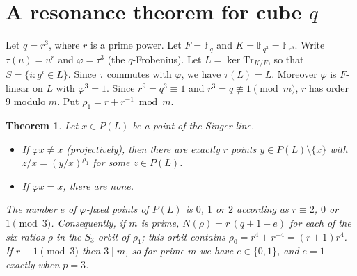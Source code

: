 \documentclass[11pt]{article}
\newtheorem{theorem}{Theorem}
\begin{document}
\section{A resonance theorem for cube $q$}\label{sec:res}
Let $q=r^3$, where $r$ is a prime power. Let $F=\mathbb F_q$ and $K=\mathbb F_{q^3}=\mathbb F_{r^9}$. Write $\tau(u)=u^r$ and $\varphi=\tau^3$ (the $q$-Frobenius).
Let $L=\ker\mathrm{Tr}_{K/F}$, so that $S=\{i: g^i\in L\}$. Since $\tau$ commutes with $\varphi$, we have $\tau(L)=L$. Moreover $\varphi$ is $F$-linear on $L$ with $\varphi^3=1$.
Since $r^9=q^3\equiv1$ and $r^3=q\not\equiv1\pmod m$, $r$ has order $9$ modulo $m$. Put $\rho_1=r+r^{-1}\bmod m$.
\begin{theorem}\label{thm:res}
Let $x\in P(L)$ be a point of the Singer line.
\begin{itemize}
\item If $\varphi x\ne x$ (projectively), then there are exactly $r$ points $y\in P(L)\setminus\{x\}$ with $z/x=(y/x)^{\rho_1}$ for some $z\in P(L)$.
\item If $\varphi x=x$, there are none.
\end{itemize}
The number $e$ of $\varphi$-fixed points of $P(L)$ is $0$, $1$ or $2$ according as $r\equiv2$, $0$ or $1\pmod3$.
Consequently, if $m$ is prime, $N(\rho)=r\,(q+1-e)$ for each of the six ratios $\rho$ in the $S_3$-orbit of $\rho_1$; this orbit contains $\rho_0=r^4+r^{-4}=(r+1)r^4$.
If $r\equiv1\pmod3$ then $3\mid m$, so for prime $m$ we have $e\in\{0,1\}$, and $e=1$ exactly when $p=3$.
\end{theorem}
\end{document}
